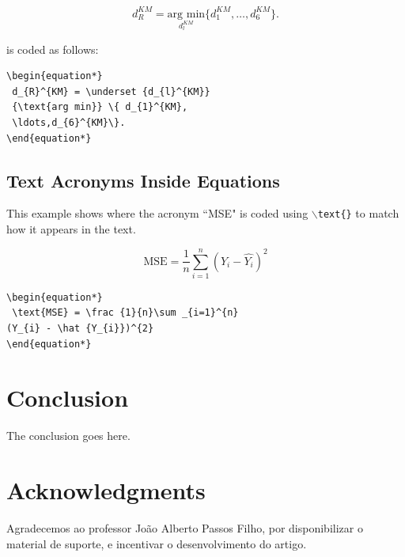 \documentclass[journal]{IEEEtran}
\begin{document}
\begin{equation*} 
  d_{R}^{KM} = \underset {d_{l}^{KM}} {\text{arg min}} \{ d_{1}^{KM},\ldots,d_{6}^{KM}\}.
\end{equation*}

\noindent is coded as follows:
\begin{verbatim}
\begin{equation*} 
 d_{R}^{KM} = \underset {d_{l}^{KM}} 
 {\text{arg min}} \{ d_{1}^{KM},
 \ldots,d_{6}^{KM}\}.
\end{equation*}
\end{verbatim}

\subsection{ Text Acronyms Inside Equations}
This example shows where the acronym ``MSE" is coded using $\backslash${\tt{text\{\}}} to match how it appears in the text.

\begin{equation*}
 \text{MSE} = \frac {1}{n}\sum _{i=1}^{n}(Y_{i} - \hat {Y_{i}})^{2}
\end{equation*}

\begin{verbatim}
\begin{equation*}
 \text{MSE} = \frac {1}{n}\sum _{i=1}^{n}
(Y_{i} - \hat {Y_{i}})^{2}
\end{equation*}
\end{verbatim}

\section{Conclusion}
The conclusion goes here.


\section*{Acknowledgments}
Agradecemos ao professor João Alberto Passos Filho, por disponibilizar o material de suporte, e incentivar o desenvolvimento do artigo. 



\end{document}

